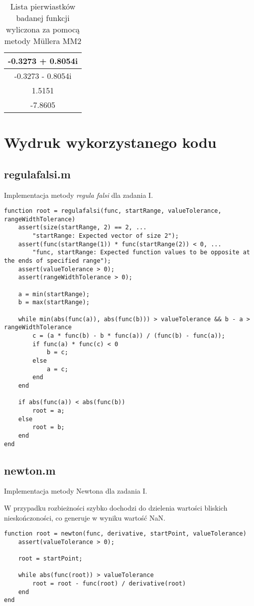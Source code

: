 \documentclass[12pt]{article}
\begin{document}
\begin{table}[!htbp]
\centering
\begin{longtable}{|c|}
    \hline
    -0.3273 + 0.8054i \\ \hline
    -0.3273 - 0.8054i \\ \hline
    1.5151 \\ \hline
    -7.8605 \\ \hline
\end{longtable}
\label{table:roots}
\caption{Lista pierwiastków badanej funkcji wyliczona za pomocą metody Müllera MM2}
\end{table}
\FloatBarrier

\clearpage
\section{Wydruk wykorzystanego kodu}

\subsection{regulafalsi.m}
Implementacja metody \textit{regula falsi} dla zadania I.
\begin{verbatim}
function root = regulafalsi(func, startRange, valueTolerance, rangeWidthTolerance)
    assert(size(startRange, 2) == 2, ...
        "startRange: Expected vector of size 2");
    assert(func(startRange(1)) * func(startRange(2)) < 0, ...
        "func, startRange: Expected function values to be opposite at the ends of specified range");
    assert(valueTolerance > 0);
    assert(rangeWidthTolerance > 0);

    a = min(startRange);
    b = max(startRange);

    while min(abs(func(a)), abs(func(b))) > valueTolerance && b - a > rangeWidthTolerance
        c = (a * func(b) - b * func(a)) / (func(b) - func(a));
        if func(a) * func(c) < 0
            b = c;
        else
            a = c;
        end
    end

    if abs(func(a)) < abs(func(b))
        root = a;
    else
        root = b;
    end
end
\end{verbatim}

\subsection{newton.m}
Implementacja metody Newtona dla zadania I.

W przypadku rozbieżności szybko dochodzi do dzielenia wartości bliskich nieskończoności, co generuje w wyniku wartość NaN.
\begin{verbatim}
function root = newton(func, derivative, startPoint, valueTolerance)
    assert(valueTolerance > 0);

    root = startPoint;

    while abs(func(root)) > valueTolerance
        root = root - func(root) / derivative(root)
    end
end

\end{verbatim}
\end{document}
